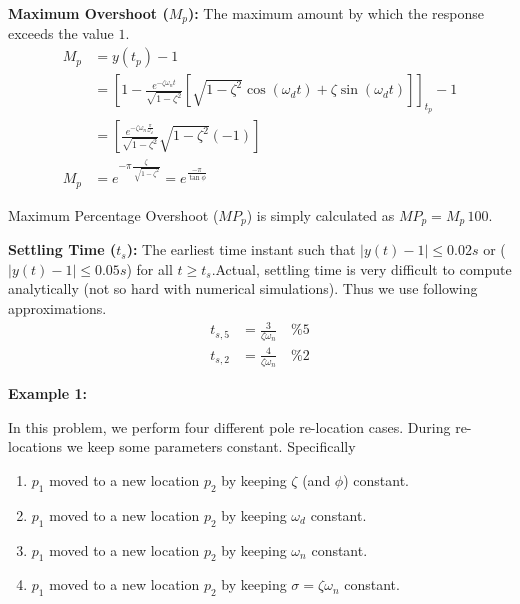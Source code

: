 \documentclass[twoside]{article}
\begin{document}
\textbf{Maximum Overshoot ($M_p$):}  The maximum amount by which the response exceeds the value $1$.
\begin{align*}
	M_p &= y(t_p) - 1
	\\
	&= \left[1 - \frac{e^{-\zeta \omega_n t}}{ \sqrt{1 - \zeta^2} } \left[ \sqrt{1 - \zeta^2} \cos(\omega_d t) + \zeta \sin(\omega_d t) 
\right] \right]_{t_p} - 1
\\
&= \left[ \frac{e^{-\zeta \omega_n \frac{\pi}{\omega_d}}}{ \sqrt{1 - \zeta^2} } \sqrt{1 - \zeta^2} (-1) \right] 
\\
M_p &= e^{-\pi  \frac{\zeta}{\ \sqrt{1 - \zeta^2}}} = e^{\frac{-\pi}{\tan \phi}} 
\end{align*}

Maximum Percentage Overshoot ($MP_p$) is simply calculated as $MP_p =
M_p \, 100$.

\textbf{Settling Time ($t_s$):}  The earliest time instant such that
$|y(t) - 1| \leq 0.02 s$ or ($|y(t) - 1| \leq 0.05 s$) for all $t \geq
t_s$.Actual, settling time is very difficult to compute analytically (not
so hard with numerical simulations). Thus we use following
approximations.
%
\begin{align*}
  t_{s,5} &=\frac{3}{\zeta \omega_n} \quad \%5 
\\ 
  t_{s,2} &=\frac{4}{\zeta \omega_n} \quad \%2
\end{align*} 


\textbf{Example 1:} 

In this problem, we perform four different pole
re-location cases. During re-locations we keep some parameters
constant. Specifically
%
\begin{enumerate}
\item $p_1$ moved to a new location $p_2$ by keeping $\zeta$ (and
  $\phi$) constant.
\item $p_1$ moved to a new location $p_2$ by keeping $\omega_d$
  constant.
\item $p_1$ moved to a new location $p_2$ by keeping $\omega_n$
  constant.
\item $p_1$ moved to a new location $p_2$ by keeping $\sigma = \zeta \omega_n$
  constant.
\end{enumerate}
\end{document}
